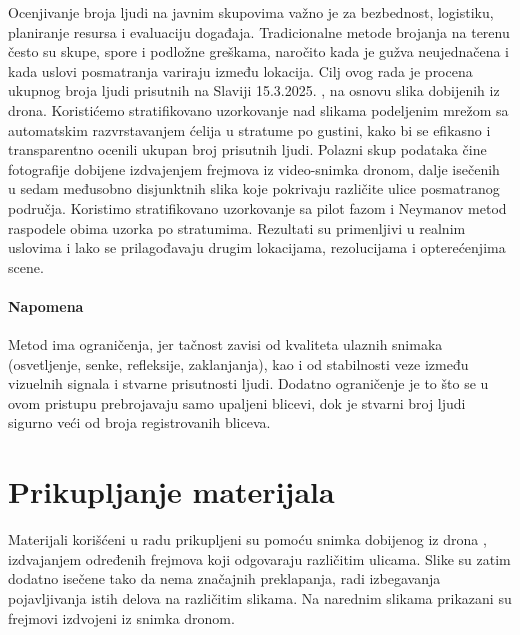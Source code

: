 \documentclass[a4paper,12pt]{article}
\begin{document}
Ocenjivanje broja ljudi na javnim skupovima važno je za bezbednost, logistiku, planiranje resursa i evaluaciju događaja. Tradicionalne metode brojanja na terenu često su skupe, spore i podložne greškama, naročito kada je gužva neujednačena i kada uslovi posmatranja variraju između lokacija.
Cilj ovog rada je procena ukupnog broja ljudi prisutnih na Slaviji 15.3.2025. , na osnovu slika dobijenih iz drona. 
\newline
\newline
\noindent Koristićemo stratifikovano uzorkovanje nad slikama podeljenim mrežom sa automatskim razvrstavanjem ćelija u stratume po gustini, kako bi se efikasno i transparentno ocenili ukupan broj prisutnih ljudi.
Polazni skup podataka čine fotografije dobijene izdvajenjem frejmova iz video-snimka dronom, dalje isečenih u sedam međusobno disjunktnih slika koje pokrivaju različite ulice posmatranog područja.
Koristimo stratifikovano uzorkovanje sa pilot fazom i Neymanov metod raspodele obima uzorka po stratumima.
\newline
\newline
\noindent Rezultati su primenljivi u realnim uslovima i lako se prilagođavaju drugim lokacijama, rezolucijama i opterećenjima scene.
\paragraph{Napomena}
Metod ima ograničenja, jer tačnost zavisi od kvaliteta ulaznih snimaka (osvetljenje, senke, refleksije, zaklanjanja), kao i od stabilnosti veze između vizuelnih signala i stvarne prisutnosti ljudi. Dodatno ograničenje je to što se u ovom pristupu prebrojavaju samo upaljeni blicevi, dok je stvarni broj ljudi sigurno veći od broja registrovanih bliceva.




\newpage
\section{Prikupljanje materijala}

Materijali korišćeni u radu prikupljeni su pomoću snimka dobijenog iz drona \cite{drone_video}, izdvajanjem određenih frejmova koji odgovaraju različitim ulicama. Slike su zatim dodatno isečene tako da nema značajnih preklapanja, radi izbegavanja pojavljivanja istih delova na različitim slikama.
Na narednim slikama prikazani su frejmovi izdvojeni iz snimka dronom.
\end{document}
